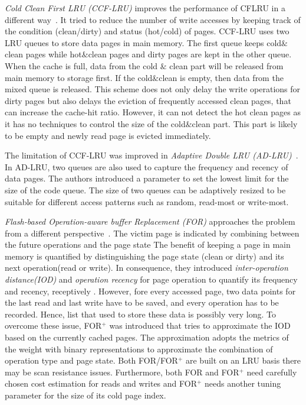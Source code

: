 \textit{Cold Clean First LRU (CCF-LRU)} improves the performance of CFLRU in a different way~\citep{Z.Li:2009}.
It tried to reduce the number of write accesses by keeping track of the condition (clean/dirty) and status (hot/cold) of pages.
CCF-LRU uses two LRU queues to store data pages in main memory.
The first queue keeps cold$\&$clean pages while hot$\&$clean pages and dirty pages are kept in the other queue.
When the cache is full, data from the cold $\&$ clean part will be released from main memory to storage first.
If the cold$\&$clean is empty, then data from the mixed queue is released.
This scheme does not only delay the write operations for dirty pages but also delays the eviction of frequently accessed clean pages, that can increase the cache-hit ratio. 
However, it can not detect the hot clean pages as it has no techniques to control the size of the cold$\&$clean part.
This part is likely to be empty and newly read page is evicted immediately.

The limitation of CCF-LRU was improved in \textit{Adaptive Double LRU (AD-LRU)}~\citep{Jin:2012}.
In AD-LRU, two queues are also used to capture the frequency and recency of data pages.
The authors introduced a parameter to set the lowest limit for the size of the code queue.
The size of two queues can be adaptively resized to be suitable for different access patterns such as random, read-most or write-most.

\textit{Flash-based Operation-aware buffer Replacement (FOR)} approaches the problem from a different perspective~\citep{Lv:2011}.
The victim page is indicated by combining between the future operations and the page state 
The benefit of keeping a page in main memory is quantified by distinguishing the page state (clean or dirty) and its next operation(read or write).
In consequence, they introduced \textit{inter-operation distance(IOD)} and \textit{operation recency} for page operation to quantify its frequency and recency, receptively .
However, fore every accessed page, two data points for the last read and last write have to be saved, and every operation has to be recorded.
Hence, list that used to store these data is possibly very long.
To overcome these issue, FOR$^{+}$ was introduced that tries to approximate the IOD based on the currently cached pages.
The approximation adopts the metrics of the weight with binary representations to approximate the combination of operation type and page state.
Both FOR/FOR$^{+}$ are built on an LRU basis there may be scan resistance issues. 
Furthermore, both FOR and FOR$^{+}$ need carefully chosen cost estimation for reads and writes and FOR$^{+}$ needs another tuning parameter for the size of its cold page index.

